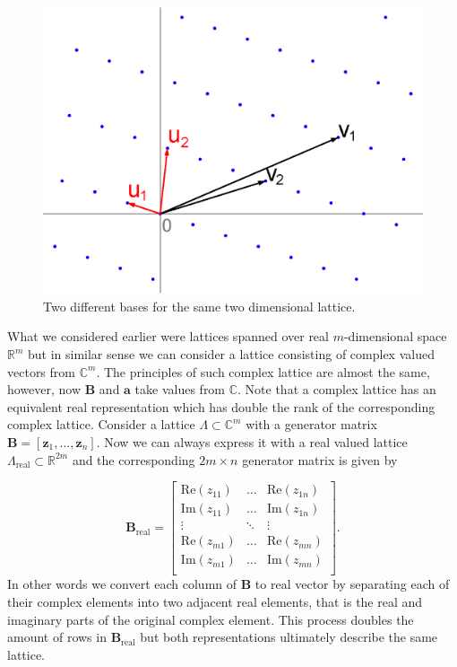 \documentclass[english,12pt,a4paper,pdftex,sci,utf8]{aaltothesis}
\begin{document}
\begin{figure}[ht]
  \centering
  \includegraphics[width=0.8\linewidth]{Lattice-reduction}
  \caption{Two different bases for the same two dimensional lattice.}
  \label{fig:bases}
\end{figure}

\par What we considered earlier were lattices spanned over real $m$-dimensional space $\mathbb{R}^m$ but in similar sense we can consider a lattice consisting of complex valued vectors from $\mathbb{C}^m$. The principles of such complex lattice are almost the same, however, now $\mathbf{B}$ and $\mathbf{a}$ take values from $\mathbb{C}$. Note that a complex lattice has an equivalent real representation which has double the rank of the corresponding complex lattice. Consider a lattice $\Lambda \subset \mathbb{C}^m$ with a generator matrix $\mathbf{B} = [\mathbf{z}_1, ... , \mathbf{z}_n]$. Now we can always express it with a real valued lattice $\Lambda_{\text{real}} \subset \mathbb{R}^{2m}$ and the corresponding $2m \times n$ generator matrix is given by

\begin{equation}
\mathbf{B}_{\text{real}} =
\begin{bmatrix} 
\text{Re}(z_{11}) & \dots  & \text{Re}(z_{1n}) \\
\text{Im}(z_{11}) & \dots  & \text{Im}(z_{1n}) \\
\vdots            & \ddots & \vdots            \\
\text{Re}(z_{m1}) & \dots  & \text{Re}(z_{mn}) \\
\text{Im}(z_{m1}) & \dots  & \text{Im}(z_{mn}) \\
\end{bmatrix}.
\label{eq:complex}
\end{equation}
In other words we convert each column of $\mathbf{B}$ to real vector by separating each of their complex elements into two adjacent real elements, that is the real and imaginary parts of the original complex element. This process doubles the amount of rows in $\mathbf{B}_{\text{real}}$ but both representations ultimately describe the same lattice. \cite{conway}
\end{document}
